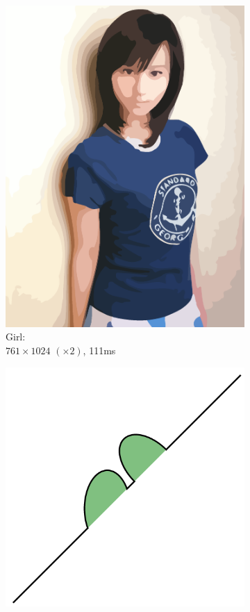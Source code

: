 \documentclass[UTF8]{ctexart}
\begin{document}
\begin{figure}[H]
\begin{subfigure}[b]{0.3\textwidth}
        \includegraphics[width=\textwidth]{images/Girl-761x1024-x2-111ms.png}
        \caption{Girl: \\$761 \times 1024$ $(\times 2)$, 111ms}
    \end{subfigure}
    \par\bigskip
    \begin{subfigure}[b]{0.3\textwidth}
        \centering
        \includegraphics[width=\textwidth]{images/Arcs-1024x1024-x2-19ms.png}

\end{subfigure}
\end{figure}
\end{document}
